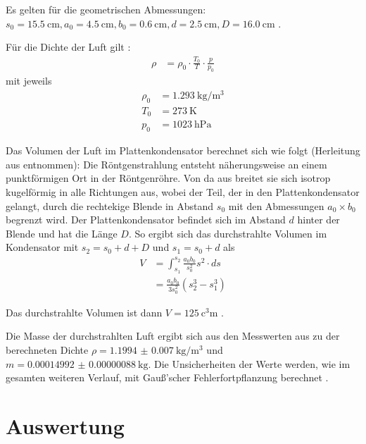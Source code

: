 Es gelten für die geometrischen Abmessungen: $s_0=\SI{15.5}{\centi\meter}, a_0 = \SI{4.5}{\centi\meter}, b_0=\SI{0.6}{\centi\meter}, d=\SI{2.5}{\centi\meter}, D = \SI{16.0}{\centi\meter}$ \cite[4]{529va}.

Für die Dichte der Luft gilt \cite[4]{529va}:
\begin{align}
	\rho &= \rho_0 \cdot \frac{T_0}{T} \cdot \frac{p}{p_0}
\end{align}
mit jeweils
\begin{align*}
	\rho_0 &= \SI{1.293}{\kilo\gram\per\cubic\meter} \\
	T_0 &= \SI{273}{\kelvin} \\
	p_0 &= \SI{1023}{\hecto\pascal}
\end{align*}

Das Volumen der Luft im Plattenkondensator berechnet sich wie folgt (Herleitung aus \cite[2]{LDdosimetrie} entnommen):
Die Röntgenstrahlung entsteht näherungsweise an einem punktförmigen Ort in der Röntgenröhre. Von da aus breitet sie sich isotrop kugelförmig in alle Richtungen aus, wobei der Teil, der in den Plattenkondensator gelangt, durch die rechtekige Blende in Abstand $s_0$ mit den Abmessungen $a_0\times b_0$ begrenzt wird. Der Plattenkondensator befindet sich im Abstand $d$ hinter der Blende und hat die Länge $D$. So ergibt sich das durchstrahlte Volumen im Kondensator mit $s_2 = s_0+d+D$ und $s_1=s_0+d$ als
\begin{align}
V &= \int^{s_2}_{s_1} \frac{a_0b_0}{s_0^2} s^2 \cdot ds\\
&= \frac{a_0b_0}{3s_0^2}(s_2^3-s_1^3)
\end{align}

Das durchstrahlte Volumen ist dann $V = \SI{125}{\cubic\centi\meter}$ \cite[2]{LDdosimetrie}.


Die Masse der durchstrahlten Luft ergibt sich aus den Messwerten aus  zu der berechneten Dichte $\rho=\SI{1.1994(70)}{\kilo\gram\per\cubic\meter}$ und $m=\SI{0.00014992(88)}{\kilo\gram}$. Die Unsicherheiten der Werte werden, wie im gesamten weiteren Verlauf, mit Gauß'scher Fehlerfortpflanzung berechnet \cite[8-9]{gerthsen}.


\section{Auswertung}

